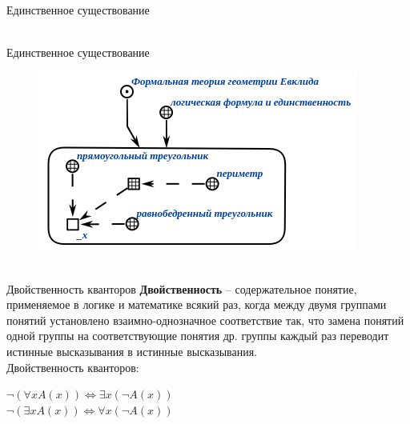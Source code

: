 \begin{frame}{\\Единственное существование}
	\topline
	\justifying
	\begin{SCn}
	\end{SCn}
\end{frame}

\begin{frame}{\\Единственное существование}
	\topline
	\justifying
	\begin{figure}[H]
		\includegraphics[scale=1.0]{./figures/sd_logic/unique_existance.png}
	\end{figure}	
\end{frame}

\begin{frame}{\\Двойственность кванторов}
	\topline
	\justifying
	\textbf{Двойственность} -- содержательное понятие, применяемое в логике и математике всякий раз, когда между двумя группами понятий установлено взаимно-однозначное соответствие так, что замена понятий одной группы на соответствующие понятия др. группы каждый раз переводит истинные высказывания в истинные высказывания.\\
	Двойственность кванторов:
	\begin{center}
		$\neg(\forall xA(x)) \iff \exists x(\neg A(x))$\\
		$\neg(\exists xA(x)) \iff \forall x(\neg A(x))$
	\end{center}
\end{frame}

